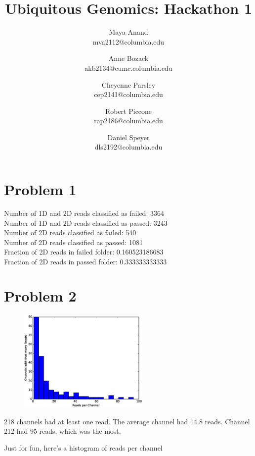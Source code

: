 \documentclass[11pt]{article}
\title{Ubiquitous Genomics: Hackathon 1}
\author{
  Maya Anand\\ mva2112@columbia.edu \and
  Anne Bozack\\ akb2134@cumc.columbia.edu \and
  Cheyenne Parsley\\ cep2141@columbia.edu \and
  Robert Piccone\\ rap2186@columbia.edu \and
  Daniel Speyer\\ dls2192@columbia.edu}
\begin{document}
\maketitle
\section*{Problem 1}
Number of 1D and 2D reads classified as failed: 3364\\
Number of 1D and 2D reads classified as passed: 3243\\
Number of 2D reads classified as failed: 540\\
Number of 2D reads classified as passed: 1081\\
Fraction of 2D reads in failed folder: 0.160523186683\\
Fraction of 2D reads in passed folder: 0.333333333333\\
\section*{Problem 2}
\begin{figure}
  \vspace{-20pt}
  \includegraphics[width=2.5in]{part2hist}
  \vspace{-20pt}
\end{figure}
218 channels had at least one read. 
The average channel had 14.8 reads. 
Channel 212 had 95 reads, which was the most.

Just for fun, here's a histogram of reads per channel\\
\end{document}
